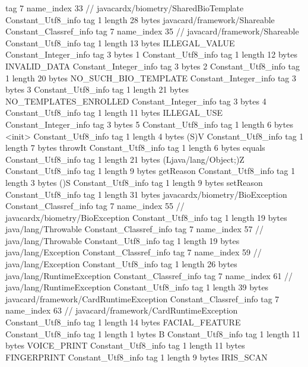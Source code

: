 {{{			tag	7
			name_index	33		// javacardx/biometry/SharedBioTemplate
		}
		Constant_Utf8_info {
			tag	1
			length	28
			bytes	javacard/framework/Shareable
		}
		Constant_Classref_info {
			tag	7
			name_index	35		// javacard/framework/Shareable
		}
		Constant_Utf8_info {
			tag	1
			length	13
			bytes	ILLEGAL_VALUE
		}
		Constant_Integer_info {
			tag	3
			bytes	1
		}
		Constant_Utf8_info {
			tag	1
			length	12
			bytes	INVALID_DATA
		}
		Constant_Integer_info {
			tag	3
			bytes	2
		}
		Constant_Utf8_info {
			tag	1
			length	20
			bytes	NO_SUCH_BIO_TEMPLATE
		}
		Constant_Integer_info {
			tag	3
			bytes	3
		}
		Constant_Utf8_info {
			tag	1
			length	21
			bytes	NO_TEMPLATES_ENROLLED
		}
		Constant_Integer_info {
			tag	3
			bytes	4
		}
		Constant_Utf8_info {
			tag	1
			length	11
			bytes	ILLEGAL_USE
		}
		Constant_Integer_info {
			tag	3
			bytes	5
		}
		Constant_Utf8_info {
			tag	1
			length	6
			bytes	<init>
		}
		Constant_Utf8_info {
			tag	1
			length	4
			bytes	(S)V
		}
		Constant_Utf8_info {
			tag	1
			length	7
			bytes	throwIt
		}
		Constant_Utf8_info {
			tag	1
			length	6
			bytes	equals
		}
		Constant_Utf8_info {
			tag	1
			length	21
			bytes	(Ljava/lang/Object;)Z
		}
		Constant_Utf8_info {
			tag	1
			length	9
			bytes	getReason
		}
		Constant_Utf8_info {
			tag	1
			length	3
			bytes	()S
		}
		Constant_Utf8_info {
			tag	1
			length	9
			bytes	setReason
		}
		Constant_Utf8_info {
			tag	1
			length	31
			bytes	javacardx/biometry/BioException
		}
		Constant_Classref_info {
			tag	7
			name_index	55		// javacardx/biometry/BioException
		}
		Constant_Utf8_info {
			tag	1
			length	19
			bytes	java/lang/Throwable
		}
		Constant_Classref_info {
			tag	7
			name_index	57		// java/lang/Throwable
		}
		Constant_Utf8_info {
			tag	1
			length	19
			bytes	java/lang/Exception
		}
		Constant_Classref_info {
			tag	7
			name_index	59		// java/lang/Exception
		}
		Constant_Utf8_info {
			tag	1
			length	26
			bytes	java/lang/RuntimeException
		}
		Constant_Classref_info {
			tag	7
			name_index	61		// java/lang/RuntimeException
		}
		Constant_Utf8_info {
			tag	1
			length	39
			bytes	javacard/framework/CardRuntimeException
		}
		Constant_Classref_info {
			tag	7
			name_index	63		// javacard/framework/CardRuntimeException
		}
		Constant_Utf8_info {
			tag	1
			length	14
			bytes	FACIAL_FEATURE
		}
		Constant_Utf8_info {
			tag	1
			length	1
			bytes	B
		}
		Constant_Utf8_info {
			tag	1
			length	11
			bytes	VOICE_PRINT
		}
		Constant_Utf8_info {
			tag	1
			length	11
			bytes	FINGERPRINT
		}
		Constant_Utf8_info {
			tag	1
			length	9
			bytes	IRIS_SCAN
}}}
